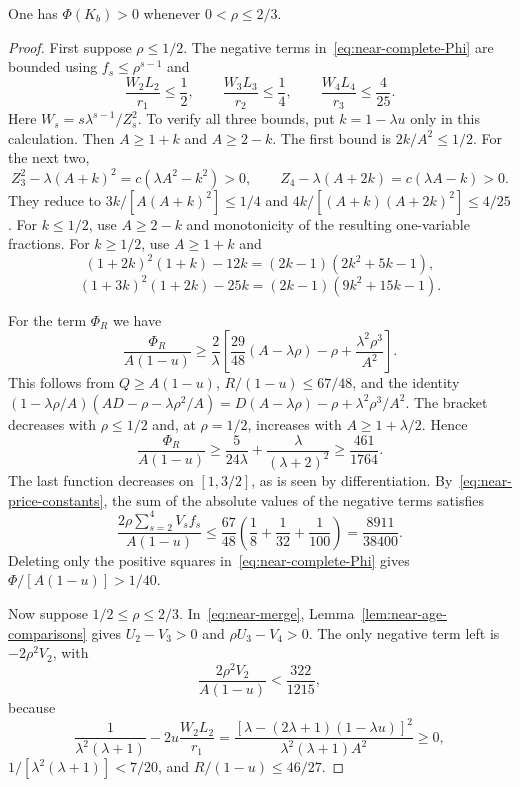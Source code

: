 \begin{lemma}\label{lem:near-low-rho}
One has $\Phi(K_b)>0$ whenever $0<\rho\le2/3$.
\end{lemma}
\begin{proof}
First suppose $\rho\le1/2$. The negative terms in~\eqref{eq:near-complete-Phi} are bounded using $f_s\le\rho^{s-1}$ and
\begin{equation}\label{eq:near-price-constants}
 \frac{W_2L_2}{r_1}\le\frac12,\qquad
 \frac{W_3L_3}{r_2}\le\frac14,\qquad
 \frac{W_4L_4}{r_3}\le\frac4{25}.
\end{equation}
Here $W_s=s\lambda^{s-1}/Z_s^2$. To verify all three bounds, put $k=1-\lambda u$ only in this calculation. Then $A\ge1+k$ and $A\ge2-k$. The first bound is $2k/A^2\le1/2$. For the next two,
\[
 Z_3^2-\lambda(A+k)^2=c(\lambda A^2-k^2)>0,
 \qquad Z_4-\lambda(A+2k)=c(\lambda A-k)>0.
\]
They reduce to $3k/[A(A+k)^2]\le1/4$ and $4k/[(A+k)(A+2k)^2]\le4/25$. For $k\le1/2$, use $A\ge2-k$ and monotonicity of the resulting one-variable fractions. For $k\ge1/2$, use $A\ge1+k$ and
\[
 (1+2k)^2(1+k)-12k=(2k-1)(2k^2+5k-1),
\]
\[
 (1+3k)^2(1+2k)-25k=(2k-1)(9k^2+15k-1).
\]

For the term $\Phi_R$ we have
\[
 \frac{\Phi_R}{A(1-u)}\ge
 \frac2\lambda\left[\frac{29}{48}(A-\lambda\rho)-\rho+
                              \frac{\lambda^2\rho^3}{A^2}\right].
\]
This follows from $Q\ge A(1-u)$, $R/(1-u)\le67/48$, and the identity
$(1-\lambda\rho/A)(AD-\rho-\lambda\rho^2/A)
=D(A-\lambda\rho)-\rho+\lambda^2\rho^3/A^2$.
The bracket decreases with $\rho\le1/2$ and, at $\rho=1/2$, increases with $A\ge1+\lambda/2$. Hence
\[
 \frac{\Phi_R}{A(1-u)}\ge\frac5{24\lambda}+\frac\lambda{(\lambda+2)^2}
 \ge\frac{461}{1764}.
\]
The last function decreases on $[1,3/2]$, as is seen by differentiation. By~\eqref{eq:near-price-constants}, the sum of the absolute values of the negative terms satisfies
\[
 \frac{2\rho\sum_{s=2}^4V_sf_s}{A(1-u)}
 \le\frac{67}{48}\left(\frac18+\frac1{32}+\frac1{100}\right)
 =\frac{8911}{38400}.
\]
Deleting only the positive squares in~\eqref{eq:near-complete-Phi} gives
$\Phi/[A(1-u)]>1/40$.

Now suppose $1/2\le\rho\le2/3$. In~\eqref{eq:near-merge}, Lemma~\ref{lem:near-age-comparisons} gives $U_2-V_3>0$ and $\rho U_3-V_4>0$. The only negative term left is $-2\rho^2V_2$, with
\[
 \frac{2\rho^2V_2}{A(1-u)}<\frac{322}{1215},
\]
because
\[
 \frac1{\lambda^2(\lambda+1)}-
       2u\frac{W_2L_2}{r_1}
 =\frac{[\lambda-(2\lambda+1)(1-\lambda u)]^2}
       {\lambda^2(\lambda+1)A^2}\ge0,
\]
$1/[\lambda^2(\lambda+1)]<7/20$, and $R/(1-u)\le46/27$.


\end{proof}
